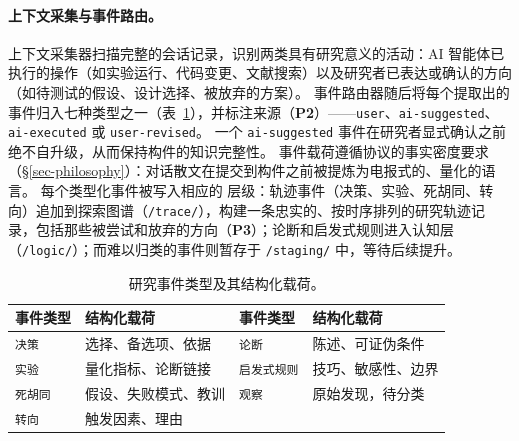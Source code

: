 \paragraph{上下文采集与事件路由。}
上下文采集器扫描完整的会话记录，识别两类具有研究意义的活动：AI 智能体已执行的操作（如实验运行、代码变更、文献搜索）以及研究者已表达或确认的方向（如待测试的假设、设计选择、被放弃的方案）。
事件路由器随后将每个提取出的事件归入七种类型之一（表~\ref{tbl-event-types}），并标注来源（\textbf{P2}）——\texttt{user}、\texttt{ai-suggested}、\texttt{ai-executed} 或 \texttt{user-revised}。
一个 \texttt{ai-suggested} 事件在研究者显式确认之前绝不自升级，从而保持构件的知识完整性。
事件载荷遵循协议的事实密度要求（\S\ref{sec-philosophy}）：对话散文在提交到构件之前被提炼为电报式的、量化的语言。
每个类型化事件被写入相应的 \ara{} 层级：轨迹事件（决策、实验、死胡同、转向）追加到探索图谱（\texttt{/trace/}），构建一条忠实的、按时序排列的研究轨迹记录，包括那些被尝试和放弃的方向（\textbf{P3}）；论断和启发式规则进入认知层（\texttt{/logic/}）；而难以归类的事件则暂存于 \texttt{/staging/} 中，等待后续提升。

\begin{table}[!t]
\centering
\small
\begin{tabular}{@{}ll@{\hskip 1.5em}ll@{}}
\toprule
\textbf{事件类型} & \textbf{结构化载荷} & \textbf{事件类型} & \textbf{结构化载荷} \\
\midrule
\texttt{决策}    & 选择、备选项、依据        &
\texttt{论断}       & 陈述、可证伪条件     \\
\texttt{实验}  & 量化指标、论断链接                &
\texttt{启发式规则}   & 技巧、敏感性、边界            \\
\texttt{死胡同}   & 假设、失败模式、教训      &
\texttt{观察} & 原始发现，待分类  \\
\texttt{转向}       & 触发因素、理由                    &
& \\
\bottomrule
\end{tabular}
\caption{研究事件类型及其结构化载荷。}
\label{tbl-event-types}
\vspace{-4pt}
\end{table}

